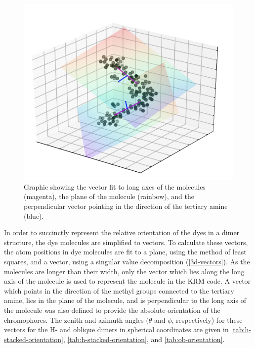 \begin{figure}[h!]
  \centering
  \includegraphics[width=0.8\linewidth]{figures/pub1/fitting-vectors.pdf}
  \caption{Graphic showing the vector fit to long axes of the molecules (magenta), the plane of the molecule (rainbow), and the perpendicular vector pointing in the direction of the tertiary amine (blue). }\label{3d-vectors}
\end{figure}
In order to succinctly represent the relative orientation of the dyes in a dimer structure, the dye molecules are simplified to vectors. To calculate these vectors, the atom positions in dye molecules are fit to a plane, using the method of least squares, and a vector, using a singular value decomposition (\autoref{3d-vectors}). As the molecules are longer than their width, only the vector which lies along the long axis of the molecule is used to represent the molecule in the KRM code. A vector which points in the direction of the methyl groups connected to the tertiary amine, lies in the plane of the molecule, and is perpendicular to the long axis of the molecule was also defined to provide the absolute orientation of the chromophores. The zenith and azimuth angles ($\theta$ and $\phi$, respectively) for these vectors for the H- and oblique dimers in spherical coordinates are given in \autoref{tab:h-stacked-orientation}, \autoref{tab:h-stacked-orientation}, and \autoref{tab:ob-orientation}.
